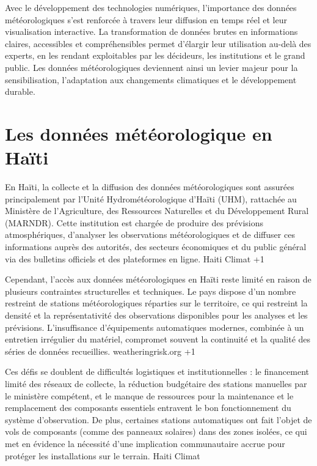 Avec le développement des technologies numériques, l’importance des données météorologiques s’est renforcée à travers leur diffusion en temps réel et leur visualisation interactive. La transformation de données brutes en informations claires, accessibles et compréhensibles permet d’élargir leur utilisation au-delà des experts, en les rendant exploitables par les décideurs, les institutions et le grand public. Les données météorologiques deviennent ainsi un levier majeur pour la sensibilisation, l’adaptation aux changements climatiques et le développement durable.

\clearpage
\section{Les données météorologique en Haïti}
En Haïti, la collecte et la diffusion des données météorologiques sont assurées principalement par l’Unité Hydrométéorologique d’Haïti (UHM), rattachée au Ministère de l’Agriculture, des Ressources Naturelles et du Développement Rural (MARNDR). Cette institution est chargée de produire des prévisions atmosphériques, d’analyser les observations météorologiques et de diffuser ces informations auprès des autorités, des secteurs économiques et du public général via des bulletins officiels et des plateformes en ligne. 
Haiti Climat
+1

Cependant, l’accès aux données météorologiques en Haïti reste limité en raison de plusieurs contraintes structurelles et techniques. Le pays dispose d’un nombre restreint de stations météorologiques réparties sur le territoire, ce qui restreint la densité et la représentativité des observations disponibles pour les analyses et les prévisions. L’insuffisance d’équipements automatiques modernes, combinée à un entretien irrégulier du matériel, compromet souvent la continuité et la qualité des séries de données recueillies. 
weatheringrisk.org
+1

Ces défis se doublent de difficultés logistiques et institutionnelles : le financement limité des réseaux de collecte, la réduction budgétaire des stations manuelles par le ministère compétent, et le manque de ressources pour la maintenance et le remplacement des composants essentiels entravent le bon fonctionnement du système d’observation. De plus, certaines stations automatiques ont fait l’objet de vols de composants (comme des panneaux solaires) dans des zones isolées, ce qui met en évidence la nécessité d’une implication communautaire accrue pour protéger les installations sur le terrain. 
Haiti Climat

